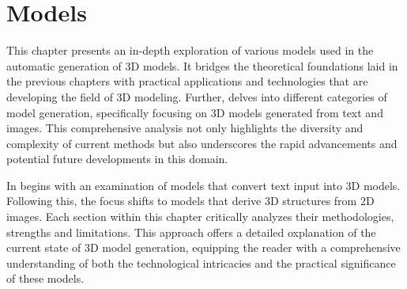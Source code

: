 \chapter{Models}\label{ch:models}

This chapter presents an in-depth exploration of various models used in the automatic generation of 3D models. It bridges the theoretical foundations laid in the previous chapters with practical applications and technologies that are developing the field of 3D modeling. Further, delves into different categories of model generation, specifically focusing on 3D models generated from text and images. This comprehensive analysis not only highlights the diversity and complexity of current methods but also underscores the rapid advancements and potential future developments in this domain.

In begins with an examination of models that convert text input into 3D models. Following this, the focus shifts to models that derive 3D structures from 2D images. Each section within this chapter critically analyzes their methodologies, strengths and limitations. This approach offers a detailed oxplanation of the current state of 3D model generation, equipping the reader with a comprehensive understanding of both the technological intricacies and the practical significance of these models.



%
